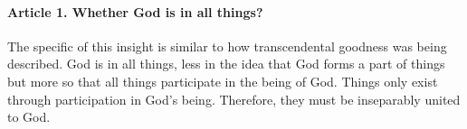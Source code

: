\documentclass{ucetd}
\begin{document}
\paragraph{Article 1. Whether God is in all things?}
The specific of this insight is similar to how transcendental goodness was being described. God is in all things, less in the idea that God forms a part of things but more so that all things participate in the being of God. Things only exist through participation in God's being. Therefore, they must be inseparably united to God.
\end{document}
